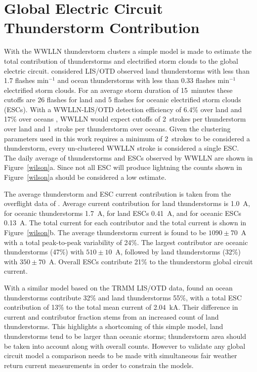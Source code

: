 \section{Global Electric Circuit Thunderstorm Contribution}

With the WWLLN thunderstorm clusters a simple model is made to estimate the total contribution of thunderstorms and electrified storm clouds to the global electric circuit.
\citet{Mach2011} considered LIS/OTD observed land thunderstorms with less than 1.7 flashes min$^{-1}$ and ocean thunderstorms with less than 0.33 flashes min$^{-1}$ electrified storm clouds.
For an average storm duration of 15~minutes these cutoffs are 26 flashes for land and 5 flashes for oceanic electrified storm clouds (ESCs).
With a WWLLN-LIS/OTD detection efficiency of 6.4\% over land and 17\% over oceans \citep{Rudlosky2013}, WWLLN would expect cutoffs of 2~strokes per thunderstorm over land and 1~stroke per thunderstorm over oceans.
Given the clustering parameters used in this work requires a minimum of 2~strokes to be considered a thunderstorm, every un-clustered WWLLN stroke is considered a single ESC.
The daily average of thunderstorms and ESCs observed by WWLLN are shown in Figure~\ref{wilson}a.
Since not all ESC will produce lightning the counts shown in Figure~\ref{wilson}a should be considered a low estimate.

The average thunderstorm and ESC current contribution is taken from the overflight data of \citet{Mach2010}.
Average current contribution for land thunderstorms is 1.0~A, for oceanic thunderstorms 1.7~A, for land ESCs 0.41~A, and for oceanic ESCs 0.13~A.
The total current for each contributor and the total current is shown in Figure~\ref{wilson}b.
The average thunderstorm current is found to be $1090 \pm 70$~A with a total peak-to-peak variability of 24\%.
The largest contributor are oceanic thunderstorms (47\%) with $510 \pm 10$~A, followed by land thunderstorms (32\%) with $350 \pm 70$~A.
Overall ESCs contribute 21\% to the thunderstorm global circuit current.

With a similar model based on the TRMM LIS/OTD data, \citet{Mach2011} found an ocean thunderstorms contribute 32\% and land thunderstorms 55\%, with a total ESC contribution of 13\% to the total mean current of 2.04~kA.
Their difference in current and contributor fraction stems from an increased count of land thunderstorms.
This highlights a shortcoming of this simple model, land thunderstorms tend to be larger than oceanic storms; thunderstorm area should be taken into account along with overall counts.
However to validate any global circuit model a comparison needs to be made with simultaneous fair weather return current measurements in order to constrain the models.

